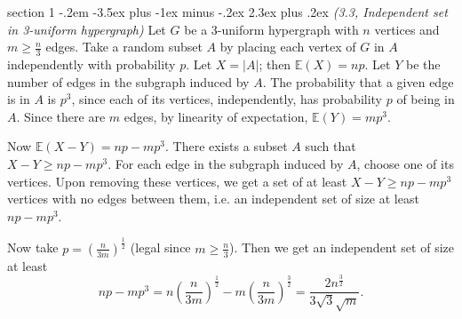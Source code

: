 \documentclass[12pt]{article}
\makeatletter
\theoremstyle{norm}
\newcommand{\E}[0]{\mathbb{E}}
\newcommand{\rc}[1]{\frac{1}{#1}}
\newcommand{\pa}[1]{\left( {#1} \right)}
\newcommand{\pf}[2]{\pa{\frac{#1}{#2}}}
\newenvironment{problem}{\@startsection
       {section}
       {1}
       {-.2em}
       {-3.5ex plus -1ex minus -.2ex}
       {2.3ex plus .2ex}
       {\pagebreak[3]%
       \large\bf\noindent{Problem }
       }
       }
       {%
       }
\makeatother
\begin{document}
\begin{problem} {\it (3.3, Independent set in 3-uniform hypergraph)}
Let $G$ be a 3-uniform hypergraph with $n$ vertices and $m\ge \frac n3$ edges. 
Take a random subset $A$ by placing each vertex of $G$ in $A$ independently with probability $p$. Let $X=|A|$; then $\E(X)=np$. 
Let $Y$ be the number of edges in the subgraph induced by $A$. The probability that a given edge is in $A$ is $p^3$, since each of its vertices, independently, has probability $p$ of being in $A$. Since there are $m$ edges, by linearity of expectation, $\E(Y)=mp^3$.

Now $\E(X-Y)=np-mp^3$. There exists a subset $A$ such that $X-Y\ge np-mp^3$. For each edge in the subgraph induced by $A$, choose one of its vertices. Upon removing these vertices, we get a set of at least $X-Y\ge np-mp^3$ vertices with no edges between them, i.e. an independent set of size at least $np-mp^3$.

Now take $p=\pf n{3m}^{\rc2}$ (legal since $m\ge \frac n3$). Then we get an independent set of size at least
\[
np-mp^3=n\pf n{3m}^{\rc 2}-m\pf{n}{3m}^{\frac 32}=\frac{2n^{\frac 32}}{3\sqrt 3 \sqrt m}.
\]
\end{problem}
\end{document}
